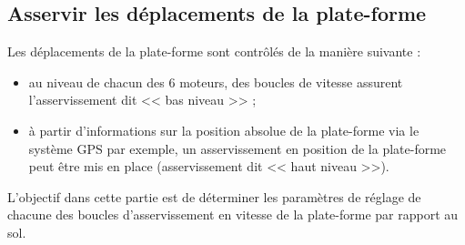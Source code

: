 %


\subsection{Asservir les déplacements de la plate-forme}
\ifprof
\else

Les déplacements de la plate-forme sont contrôlés de la manière suivante :
\begin{itemize}
\item au niveau de chacun des 6 moteurs, des boucles de vitesse assurent l'asservissement dit << bas niveau >> ;
\item à partir d'informations sur la position absolue de la plate-forme via le système GPS par exemple, un asservissement en position de la plate-forme peut être mis en place (asservissement dit << haut niveau >>).
\end{itemize}
L'objectif dans cette partie est de déterminer les paramètres de réglage de chacune des boucles d'asservissement en vitesse de la plate-forme par rapport au sol.

